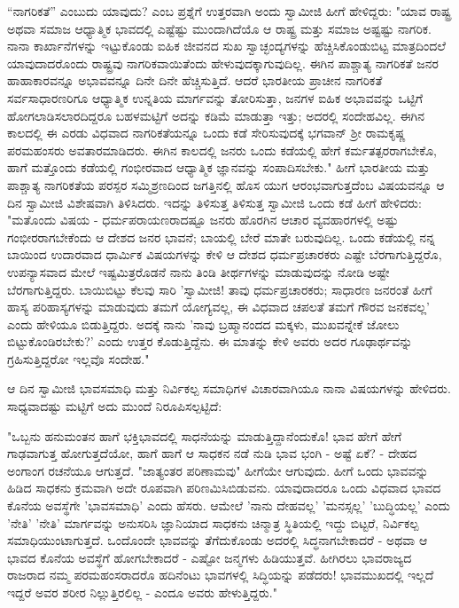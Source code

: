 “ನಾಗರಿಕತೆ” ಎಂಬುದು ಯಾವುದು? ಎಂಬ ಪ್ರಶ್ನೆಗೆ ಉತ್ತರವಾಗಿ ಅಂದು ಸ್ವಾಮೀಜಿ ಹೀಗೆ ಹೇಳಿದ್ದರು: "ಯಾವ ರಾಷ್ಟ್ರ ಅಥವಾ ಸಮಾಜ ಆಧ್ಯಾತ್ಮಿಕ ಭಾವದಲ್ಲಿ ಎಷ್ಟೆಷ್ಟು ಮುಂದಾಗಿದೆಯೊ ಆ ರಾಷ್ಟ್ರ ಮತ್ತು ಸಮಾಜ ಅಷ್ಟಷ್ಟು ನಾಗರಿಕ. ನಾನಾ ಕಾರ್ಖಾನೆಗಳನ್ನು ಇಟ್ಟುಕೊಂಡು ಐಹಿಕ ಜೀವನದ ಸುಖ ಸ್ವಾಚ್ಛಂದ್ಯಗಳನ್ನು ಹೆಚ್ಚಿಸಿಕೊಂಡುಬಿಟ್ಟ ಮಾತ್ರದಿಂದಲೆ ಯಾವುದಾದರೊಂದು ರಾಷ್ಟ್ರವು ನಾಗರಿಕವಾಯಿತೆಂದು ಹೇಳುವುದಕ್ಕಾಗುವುದಿಲ್ಲ. ಈಗಿನ ಪಾಶ್ಚಾತ್ಯ ನಾಗರಿಕತೆ ಜನರ ಹಾಹಾಕಾರವನ್ನೂ ಅಭಾವವನ್ನೂ ದಿನೇ ದಿನೇ ಹೆಚ್ಚಿಸುತ್ತಿದೆ. ಆದರೆ ಭಾರತೀಯ ಪ್ರಾಚೀನ ನಾಗರಿಕತೆ ಸರ್ವಸಾಧಾರಣರಿಗೂ ಆಧ್ಯಾತ್ಮಿಕ ಉನ್ನತಿಯ ಮಾರ್ಗವನ್ನು ತೋರಿಸುತ್ತಾ, ಜನಗಳ ಐಹಿಕ ಅಭಾವವನ್ನು ಒಟ್ಟಿಗೆ ಹೋಗಲಾಡಿಸಲಾರದಿದ್ದರೂ ಬಹಳಮಟ್ಟಿಗೆ ಅದನ್ನು ಕಡಿಮೆ ಮಾಡುತ್ತಾ ಇತ್ತು; ಅದರಲ್ಲಿ ಸಂದೇಹವಿಲ್ಲ. ಈಗಿನ ಕಾಲದಲ್ಲಿ ಈ ಎರಡು ವಿಧವಾದ ನಾಗರಿಕತೆಯನ್ನೂ ಒಂದು ಕಡೆ ಸೇರಿಸುವುದಕ್ಕೆ ಭಗವಾನ್ ಶ‍್ರೀ ರಾಮಕೃಷ್ಣ ಪರಮಹಂಸರು ಅವತಾರಮಾಡಿದರು. ಈಗಿನ ಕಾಲದಲ್ಲಿ ಜನರು ಒಂದು ಕಡೆಯಲ್ಲಿ ಹೇಗೆ ಕರ್ಮತತ್ಪರರಾಗಬೇಕೊ, ಹಾಗೆ ಮತ್ತೊಂದು ಕಡೆಯಲ್ಲಿ ಗಂಭೀರವಾದ ಆಧ್ಯಾತ್ಮಿಕ ಜ್ಞಾನವನ್ನು ಸಂಪಾದಿಸಬೇಕು." ಹೀಗೆ ಭಾರತೀಯ ಮತ್ತು ಪಾಶ್ಚಾತ್ಯ ನಾಗರಿಕತೆಯ ಪರಸ್ಪರ ಸಮ್ಮಿಶ್ರಣದಿಂದ ಜಗತ್ತಿನಲ್ಲಿ ಹೊಸ ಯುಗ ಆರಂಭವಾಗುತ್ತದೆಂಬ ವಿಷಯವನ್ನೂ ಆ ದಿನ ಸ್ವಾಮೀಜಿ ವಿಶೇಷವಾಗಿ ತಿಳಿಸಿದರು. ಇದನ್ನು ತಿಳಿಸುತ್ತ ತಿಳಿಸುತ್ತ ಸ್ವಾಮೀಜಿ ಒಂದು ಕಡೆ ಹೀಗೆ ಹೇಳಿದರು: "ಮತೊಂದು ವಿಷಯ - ಧರ್ಮಪರಾಯಣರಾದಷ್ಟೂ ಜನರು ಹೊರಗಿನ ಆಚಾರ ವ್ಯವಹಾರಗಳಲ್ಲಿ ಅಷ್ಟು ಗಂಭೀರರಾಗಬೇಕೆಂದು ಆ ದೇಶದ ಜನರ ಭಾವನೆ; ಬಾಯಲ್ಲಿ ಬೇರೆ ಮಾತೇ ಬರುವುದಿಲ್ಲ. ಒಂದು ಕಡೆಯಲ್ಲಿ ನನ್ನ ಬಾಯಿಂದ ಉದಾರವಾದ ಧಾರ್ಮಿಕ ವಿಷಯಗಳನ್ನು ಕೇಳಿ ಆ ದೇಶದ ಧರ್ಮಪ್ರಚಾರಕರು ಎಷ್ಟೇ ಬೆರಗಾಗುತ್ತಿದ್ದರೊ, ಉಪನ್ಯಾಸವಾದ ಮೇಲೆ ಇಷ್ಟಮಿತ್ರರೊಡನೆ ನಾನು ತಿಂಡಿ ತೀರ್ಥಗಳನ್ನು ಮಾಡುವುದನ್ನು ನೋಡಿ ಅಷ್ಟೇ ಬೆರಗಾಗುತ್ತಿದ್ದರು. ಬಾಯಿಬಿಟ್ಟು ಕೆಲವು ಸಾರಿ 'ಸ್ವಾಮೀಜಿ! ತಾವು ಧರ್ಮಪ್ರಚಾರಕರು; ಸಾಧಾರಣ ಜನರಂತೆ ಹೀಗೆ ಹಾಸ್ಯ ಪರಿಹಾಸ್ಯಗಳನ್ನು ಮಾಡುವುದು ತಮಗೆ ಯೋಗ್ಯವಲ್ಲ, ಈ ವಿಧವಾದ ಚಪಲತೆ ತಮಗೆ ಗೌರವ ಜನಕವಲ್ಲ' ಎಂದು ಹೇಳಿಯೂ ಬಿಡುತ್ತಿದ್ದರು. ಅದಕ್ಕೆ ನಾನು 'ನಾವು ಬ್ರಹ್ಮಾನಂದದ ಮಕ್ಕಳು, ಮುಖವನ್ನೇಕೆ ಜೋಲು ಬಿಟ್ಟುಕೊಂಡಿರಬೇಕು?' ಎಂದು ಉತ್ತರ ಕೊಡುತ್ತಿದ್ದೆನು. ಈ ಮಾತನ್ನು ಕೇಳಿ ಅವರು ಅದರ ಗೂಢಾರ್ಥವನ್ನು ಗ್ರಹಿಸುತ್ತಿದ್ದರೋ ಇಲ್ಲವೊ ಸಂದೇಹ."

ಆ ದಿನ ಸ್ವಾಮೀಜಿ ಭಾವಸಮಾಧಿ ಮತ್ತು ನಿರ್ವಿಕಲ್ಪ ಸಮಾಧಿಗಳ ವಿಚಾರವಾಗಿಯೂ ನಾನಾ ವಿಷಯಗಳನ್ನು ಹೇಳಿದರು. ಸಾಧ್ಯವಾದಷ್ಟು ಮಟ್ಟಿಗೆ ಅದು ಮುಂದೆ ನಿರೂಪಿಸಲ್ಪಟ್ಟಿದೆ:

"ಒಬ್ಬನು ಹನುಮಂತನ ಹಾಗೆ ಭಕ್ತಿಭಾವದಲ್ಲಿ ಸಾಧನೆಯನ್ನು ಮಾಡುತ್ತಿದ್ದಾನೆಂದುಕೊ! ಭಾವ ಹೇಗೆ ಹೇಗೆ ಗಾಢವಾಗುತ್ತ ಹೋಗುತ್ತದೆಯೋ, ಹಾಗೆ ಹಾಗೆ ಆ ಸಾಧಕನ ನಡೆ ನುಡಿ ಭಾವ ಭಂಗಿ - ಅಷ್ಟೆ ಏಕೆ? - ದೇಹದ ಅಂಗಾಂಗ ರಚನೆಯೂ ಆಗುತ್ತದೆ. "ಜಾತ್ಯಂತರ ಪರಿಣಾಮವು" ಹೀಗೆಯೇ ಆಗುವುದು. ಹೀಗೆ ಒಂದು ಭಾವವನ್ನು ಹಿಡಿದ ಸಾಧಕನು ಕ್ರಮವಾಗಿ ಅದೇ ರೂಪವಾಗಿ ಪರಿಣಮಿಸಿಬಿಡುವನು. ಯಾವುದಾದರೂ ಒಂದು ವಿಧವಾದ ಭಾವದ ಕೊನೆಯ ಅವಸ್ಥೆಗೇ 'ಭಾವಸಮಾಧಿ' ಎಂದು ಹೆಸರು. ಆಮೇಲೆ 'ನಾನು ದೇಹವಲ್ಲ' 'ಮನಸ್ಸಲ್ಲ' 'ಬುದ್ಧಿಯಲ್ಲ' ಎಂದು 'ನೇತಿ' 'ನೇತಿ' ಮಾರ್ಗವನ್ನು ಅನುಸರಿಸಿ ಜ್ಞಾನಿಯಾದ ಸಾಧಕನು ಚಿನ್ಮಾತ್ರ ಸ್ಥಿತಿಯಲ್ಲಿ ಇದ್ದು ಬಿಟ್ಟರೆ, ನಿರ್ವಿಕಲ್ಪ ಸಮಾಧಿಯುಂಟಾಗುತ್ತದೆ. ಒಂದೊಂದೇ ಭಾವವನ್ನು ತೆಗೆದುಕೊಂಡು ಅದರಲ್ಲಿ ಸಿದ್ಧನಾಗಬೇಕಾದರೆ - ಅಥವಾ ಆ ಭಾವದ ಕೊನೆಯ ಅವಸ್ಥೆಗೆ ಹೋಗಬೇಕಾದರೆ - ಎಷ್ಟೋ ಜನ್ಮಗಳು ಹಿಡಿಯುತ್ತವೆ. ಹೀಗಿರಲು ಭಾವರಾಜ್ಯದ ರಾಜರಾದ ನಮ್ಮ ಪರಮಹಂಸರಾದರೊ ಹದಿನೆಂಟು ಭಾವಗಳಲ್ಲಿ ಸಿದ್ಧಿಯನ್ನು ಪಡೆದರು! ಭಾವಮುಖದಲ್ಲಿ ಇಲ್ಲದೆ ಇದ್ದರೆ ಅವರ ಶರೀರ ನಿಲ್ಲುತ್ತಿರಲಿಲ್ಲ - ಎಂದೂ ಅವರು ಹೇಳುತ್ತಿದ್ದರು."

